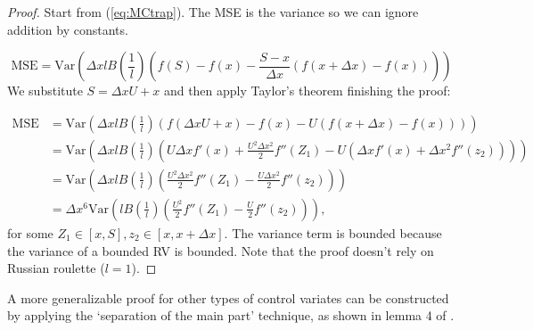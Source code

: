 \documentclass[a4paper,12pt]{article}
\begin{document}
\begin{proof}
    Start from (\ref{eq:MCtrap}). The MSE is the variance
    so we can ignore addition by constants.

    \begin{equation}
        \text{MSE} = \text{Var}\left( \Delta x l B\left( \frac{1}{l}\right)
        \left(f(S) - f(x) - \frac{S - x}{\Delta x}
        \left(f(x+\Delta x) - f(x)\right) \right)\right)
    \end{equation}
    We substitute $S = \Delta x U + x$ and then apply Taylor's theorem
    finishing the proof:

    \begin{align}
        \text{MSE} & = \text{Var}\left( \Delta x l B\left( \frac{1}{l}\right)
        \left(f(\Delta x U+x) - f(x) - U
        \left(f(x+\Delta x) - f(x)\right) \right)\right)                           \\
                   & = \text{Var}\left( \Delta x l B\left( \frac{1}{l}\right)
        \left( U \Delta x f'(x)+ \frac{U^{2} \Delta x ^{2}}{2} f''(Z_{1})
        - U \left( \Delta x f'(x) +
        \Delta x ^{2} f''(z_{2})\right) \right)\right)                             \\
                   & = \text{Var}\left( \Delta x l B\left( \frac{1}{l}\right)
        \left( \frac{U^{2} \Delta x ^{2}}{2} f''(Z_{1})
        -  \frac{U\Delta x ^{2}}{2} f''(z_{2}) \right)\right)                      \\
                   & =\Delta x ^{6} \text{Var}\left(  l B\left( \frac{1}{l}\right)
        \left( \frac{U^{2} }{2} f''(Z_{1})
        -  \frac{U}{2} f''(z_{2}) \right)\right),
    \end{align}
    for some $Z_{1} \in [x,S], z_{2} \in [x,x+\Delta x]$. The variance term is bounded
    because the variance of a bounded RV is bounded.
    Note that the proof doesn't rely on Russian roulette ($l=1$).
\end{proof}

\begin{related}
    A more generalizable proof for other types of control variates can
    be constructed by applying the \enquote*{separation of the main part} technique,
    as shown in lemma 4 of \cite{mathe_monte_nodate}.
\end{related}
\end{document}

